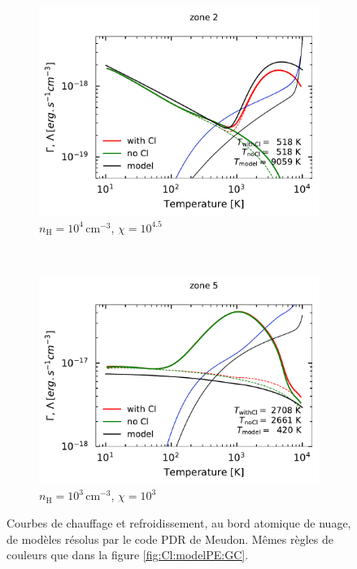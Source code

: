 \begin{figure}[!h]
    \centering
    \begin{subfigure}[t]{0.49\textwidth} %
        \centering \includegraphics[trim = {0 0 0 1cm },clip,width=1\textwidth]{figure/Cl/particuliers/GCcomp_Cl_2.pdf}
        \caption{$n_\mathrm{H}=10^4 \, \mathrm{cm}^{-3}$, $\chi=10^{4.5}$}
        \label{fig:Cl:particulier:2}
    \end{subfigure}
    ~ 
    \begin{subfigure}[t]{0.49\textwidth}
        \centering \includegraphics[trim = {0 0 0 1cm },clip,width=1\textwidth]{figure/Cl/particuliers/GCcomp_Cl_5.pdf}
        \caption{$n_\mathrm{H}=10^3 \, \mathrm{cm}^{-3}$, $\chi=10^3$}
        \label{fig:Cl:particulier:4}
    \end{subfigure}
    \caption{Courbes de chauffage et refroidissement, au bord atomique de nuage, de modèles résolus par le code PDR de Meudon. Mêmes règles de couleurs que dans la figure \ref{fig:Cl:modelPE:GC}.}
\end{figure}



